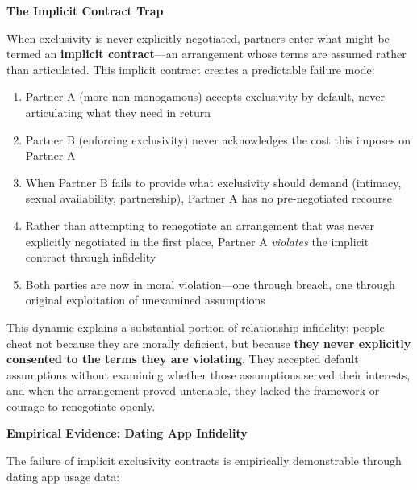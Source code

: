 \documentclass[12pt,openany]{book}
\numberwithin{equation}{chapter}
\begin{document}
\textbf{The Implicit Contract Trap}

When exclusivity is never explicitly negotiated, partners enter what might be termed an \textbf{implicit contract}---an arrangement whose terms are assumed rather than articulated. This implicit contract creates a predictable failure mode:

\begin{enumerate}
    \item Partner A (more non-monogamous) accepts exclusivity by default, never articulating what they need in return
    \item Partner B (enforcing exclusivity) never acknowledges the cost this imposes on Partner A
    \item When Partner B fails to provide what exclusivity should demand (intimacy, sexual availability, partnership), Partner A has no pre-negotiated recourse
    \item Rather than attempting to renegotiate an arrangement that was never explicitly negotiated in the first place, Partner A \textit{violates} the implicit contract through infidelity
    \item Both parties are now in moral violation---one through breach, one through original exploitation of unexamined assumptions
\end{enumerate}

This dynamic explains a substantial portion of relationship infidelity: people cheat not because they are morally deficient, but because \textbf{they never explicitly consented to the terms they are violating}. They accepted default assumptions without examining whether those assumptions served their interests, and when the arrangement proved untenable, they lacked the framework or courage to renegotiate openly.

\textbf{Empirical Evidence: Dating App Infidelity}

The failure of implicit exclusivity contracts is empirically demonstrable through dating app usage data:
\end{document}
